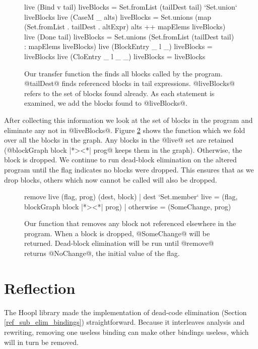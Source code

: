 \documentclass[12pt]{report}
\begin{document}
\begin{figure}[h]
\begin{code}
live (Bind v tail) liveBlocks = 
  Set.fromList (tailDest tail) `Set.union` liveBlocks
live (CaseM _ alts) liveBlocks = 
  Set.unions (map (Set.fromList . tailDest . altExpr) alts 
    ++ mapElems liveBlocks)
live (Done tail) liveBlocks = 
  Set.unions (Set.fromList (tailDest tail) 
    : mapElems liveBlocks)
live (BlockEntry _ l _) liveBlocks = liveBlocks
live (CloEntry _ l _ _) liveBlocks = liveBlocks
\end{code}
\caption{Our transfer function the finds all blocks called by the
  program. @tailDest@ finds referenced blocks in tail
  expressions. @liveBlocks@ refers to the set of blocks found
  already. As each statement is examined, we add the blocks found
  to @liveBlocks@.}
\label{ref_figure_liveBlocks}
\end{figure}

After collecting this information we look at the set of blocks in the
program and eliminate any not in @liveBlocks@. Figure
\ref{ref_figure_remove} shows the function which we fold over all the
blocks in the graph. Any blocks in the @live@ set are retained
(@blockGraph block |*><*| prog@ keeps them in the graph). Otherwise,
the block is dropped. We continue to run dead-block elimination on the
altered program until the flag indicates no blocks were dropped. This ensures
that as we drop blocks, others which now cannot be called will also be dropped.

\begin{figure}[h]
  \begin{code}
remove live (flag, prog) (dest, block) 
  | dest `Set.member` live = (flag, blockGraph block |*><*| prog)
  | otherwise = (SomeChange, prog)
  \end{code}
  \caption{Our function that removes any block not referenced
    elsewhere in the program. When a block is dropped, @SomeChange@
    will be returned. Dead-block elimination will be run until
    @remove@ returns @NoChange@, the initial value of the flag.}
  \label{ref_figure_remove}
\end{figure}

\section{Reflection}

The Hoopl library made the implementation of dead-code elimination
(Section \ref{ref_sub_elim_bindings}) straightforward. Because it
interleaves analysis and rewriting, removing one useless binding 
can make other bindings useless, which will in turn be removed. 
\end{document}
